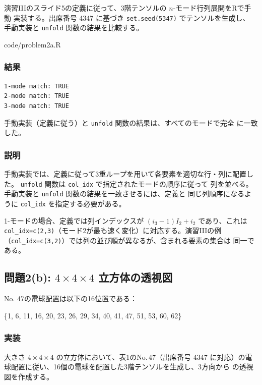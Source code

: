 \documentclass[12pt,a4paper]{ltjsarticle}
\begin{document}
演習IIIのスライド5の定義に従って、3階テンソルの $n$-モード行列展開をRで手動
実装する。出席番号 4347 に基づき \texttt{set.seed(5347)} でテンソルを生成し、
手動実装と \texttt{unfold} 関数の結果を比較する。


{code/problem2a.R}

\subsubsection{結果}

\begin{lstlisting}
1-mode match: TRUE 
2-mode match: TRUE 
3-mode match: TRUE
\end{lstlisting}

手動実装（定義に従う）と \texttt{unfold} 関数の結果は、すべてのモードで完全
に一致した。

\subsubsection{説明}

手動実装では、定義に従って3重ループを用いて各要素を適切な行・列に配置した。
\texttt{unfold} 関数は \texttt{col\_idx} で指定されたモードの順序に従って
列を並べる。手動実装と \texttt{unfold} 関数の結果を一致させるには、定義と
同じ列順序になるように \texttt{col\_idx} を指定する必要がある。

1-モードの場合、定義では列インデックスが $(i_3-1)I_2 + i_2$ であり、これは
\texttt{col\_idx=c(2,3)}（モード2が最も速く変化）に対応する。演習IIIの例
（\texttt{col\_idx=c(3,2)}）では列の並び順が異なるが、含まれる要素の集合は
同一である。

\newpage
\subsection{問題2(b): $4 \times 4 \times 4$ 立方体の透視図}

No. 47の電球配置は以下の16位置である：
\begin{center}
\{1, 6, 11, 16, 20, 23, 26, 29, 34, 40, 41, 47, 51, 53, 60, 62\}
\end{center}

\subsubsection{実装}

大きさ $4 \times 4 \times 4$ の立方体において、表1のNo.\,47（出席番号 4347
に対応）の電球配置に従い、16個の電球を配置した3階テンソルを生成し、3方向から
の透視図を作成する。
\end{document}
